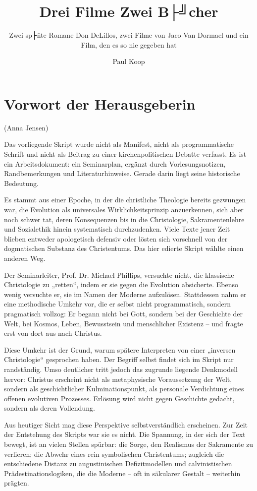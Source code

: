\documentclass[
  ngerman,
]{article}
\title{Drei Filme Zwei B├╝cher}
\subtitle{Zwei sp├ñte Romane Don DeLillos, zwei Filme von Jaco Van
Dormael und ein Film, den es so nie gegeben hat}
\author{Paul Koop}
\date{}
\begin{document}
\maketitle

{
\setcounter{tocdepth}{3}
\tableofcontents
}
\section{Vorwort der Herausgeberin}\label{vorwort-der-herausgeberin}

(Anna Jensen)

Das vorliegende Skript wurde nicht als Manifest, nicht als
programmatische Schrift und nicht als Beitrag zu einer
kirchenpolitischen Debatte verfasst. Es ist ein Arbeitsdokument: ein
Seminarplan, ergänzt durch Vorlesungsnotizen, Randbemerkungen und
Literaturhinweise. Gerade darin liegt seine historische Bedeutung.

Es stammt aus einer Epoche, in der die christliche Theologie bereits
gezwungen war, die Evolution als universales Wirklichkeitsprinzip
anzuerkennen, sich aber noch schwer tat, deren Konsequenzen bis in die
Christologie, Sakramentenlehre und Sozialethik hinein systematisch
durchzudenken. Viele Texte jener Zeit blieben entweder apologetisch
defensiv oder lösten sich vorschnell von der dogmatischen Substanz des
Christentums. Das hier edierte Skript wählte einen anderen Weg.

Der Seminarleiter, Prof. Dr. Michael Phillips, versuchte nicht, die
klassische Christologie zu „retten``, indem er sie gegen die Evolution
absicherte. Ebenso wenig versuchte er, sie im Namen der Moderne
aufzulösen. Stattdessen nahm er eine methodische Umkehr vor, die er
selbst nicht programmatisch, sondern pragmatisch vollzog: Er begann
nicht bei Gott, sondern bei der Geschichte der Welt, bei Kosmos, Leben,
Bewusstsein und menschlicher Existenz -- und fragte erst von dort aus
nach Christus.

Diese Umkehr ist der Grund, warum spätere Interpreten von einer
„inversen Christologie`` gesprochen haben. Der Begriff selbst findet
sich im Skript nur randständig. Umso deutlicher tritt jedoch das
zugrunde liegende Denkmodell hervor: Christus erscheint nicht als
metaphysische Voraussetzung der Welt, sondern als geschichtlicher
Kulminationspunkt, als personale Verdichtung eines offenen evolutiven
Prozesses. Erlösung wird nicht gegen Geschichte gedacht, sondern als
deren Vollendung.

Aus heutiger Sicht mag diese Perspektive selbstverständlich erscheinen.
Zur Zeit der Entstehung des Skripts war sie es nicht. Die Spannung, in
der sich der Text bewegt, ist an vielen Stellen spürbar: die Sorge, den
Realismus der Sakramente zu verlieren; die Abwehr eines rein
symbolischen Christentums; zugleich die entschiedene Distanz zu
augustinischen Defizitmodellen und calvinistischen
Prädestinationslogiken, die die Moderne -- oft in säkularer Gestalt --
weiterhin prägten.
\end{document}
